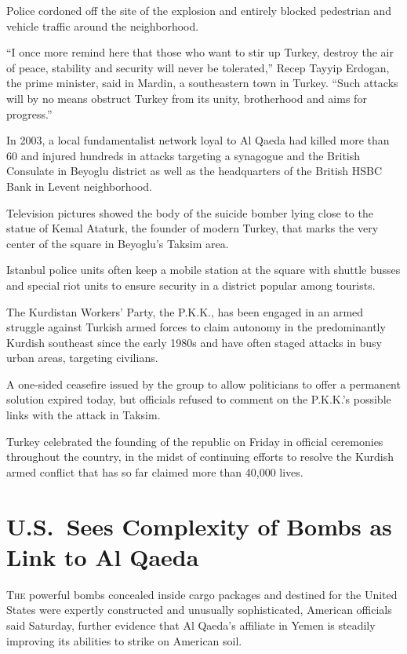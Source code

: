 ﻿\documentclass[12pt]{article}
\begin{document}
Police cordoned off the site of the explosion and entirely blocked pedestrian and vehicle traffic
around the neighborhood.

``I once more remind here that those who want to stir up Turkey, destroy the air of peace, stability
and security will never be tolerated,'' Recep Tayyip Erdogan, the prime minister, said in Mardin, a
southeastern town in Turkey. ``Such attacks will by no means obstruct Turkey from its unity,
brotherhood and aims for progress.''

In 2003, a local fundamentalist network loyal to Al Qaeda had killed more than 60 and injured
hundreds in attacks targeting a synagogue and the British Consulate in Beyoglu district as well as
the headquarters of the British HSBC Bank in Levent neighborhood.

Television pictures showed the body of the suicide bomber lying close to the statue of Kemal
Ataturk, the founder of modern Turkey, that marks the very center of the square in Beyoglu's Taksim
area.

Istanbul police units often keep a mobile station at the square with shuttle busses and special riot
units to ensure security in a district popular among tourists.

The Kurdistan Workers' Party, the P.K.K., has been engaged in an armed struggle against Turkish
armed forces to claim autonomy in the predominantly Kurdish southeast since the early 1980s and have
often staged attacks in busy urban areas, targeting civilians.

A one-sided ceasefire issued by the group to allow politicians to offer a permanent solution expired
today, but officials refused to comment on the P.K.K.'s possible links with the attack in Taksim.

Turkey celebrated the founding of the republic on Friday in official ceremonies throughout the
country, in the midst of continuing efforts to resolve the Kurdish armed conflict that has so far
claimed more than 40,000 lives.

\section{U.S.~Sees Complexity of Bombs as Link to Al Qaeda}

\lettrine{T}{he} powerful bombs concealed inside cargo packages and destined
for the United States were expertly constructed and unusually sophisticated, American officials said
Saturday, further evidence that Al Qaeda's affiliate in Yemen is steadily improving its abilities to
strike on American soil.
\end{document}
